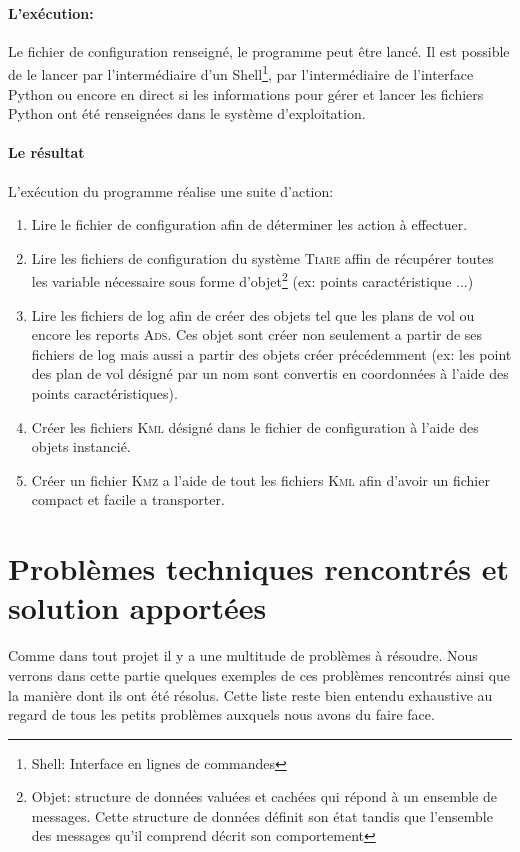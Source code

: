             \paragraph{L'exécution:}
Le fichier de configuration renseigné, le programme peut être lancé. Il est possible de le lancer par l'intermédiaire d'un Shell\footnote{Shell: Interface en lignes de commandes}, par l'intermédiaire de l'interface Python ou encore en direct si les informations pour gérer et lancer les fichiers Python ont été renseignées dans le système d'exploitation.
            \paragraph{Le résultat}
L'exécution du programme réalise une suite d'action:
\begin{enumerate}
    \item Lire le fichier de configuration afin de déterminer les action à effectuer.
    \item Lire les fichiers de configuration du système \textsc{Tiare} affin de récupérer toutes les variable nécessaire sous forme d'objet\footnote{Objet: structure de données valuées et cachées qui répond à un ensemble de messages. Cette structure de données définit son état tandis que l'ensemble des messages qu'il comprend décrit son comportement} (ex: points caractéristique ...)
    \item Lire les fichiers de log afin de créer des objets tel que les plans de vol ou encore les reports \textsc{Ads}. Ces objet sont créer non seulement a partir de ses fichiers de log mais aussi a partir des objets créer précédemment (ex: les point des plan de vol désigné par un nom sont convertis en coordonnées à l'aide des points caractéristiques).
    \item Créer les fichiers \textsc{Kml} désigné dans le fichier de configuration à l'aide des objets instancié.
    \item Créer un fichier \textsc{Kmz} a l'aide de tout les fichiers \textsc{Kml} afin d'avoir un fichier compact et facile a transporter.
\end{enumerate}


\section{Problèmes techniques rencontrés et solution apportées}
Comme dans tout projet il y a une multitude de problèmes à résoudre. Nous verrons dans cette partie quelques exemples de ces problèmes rencontrés ainsi que la manière dont ils ont été résolus. Cette liste reste bien entendu exhaustive au regard de tous les petits problèmes auxquels nous avons du faire face.

